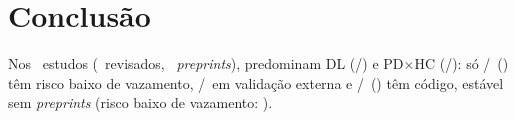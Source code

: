 \section{Conclusão} \label{sec:conclusao}

Nos \nTotal\ estudos (\nRevisadosPares\ revisados, \nPreprints\ \textit{preprints}),
predominam DL (\nFamDL/\nTotal) e PD$\times$HC (\nCenPDHC/\nTotal): só
\nRiscoBaixo/\nAplicaveisVaz\ (\pctRiscoBaixoAplic) têm risco baixo de vazamento,
\nValExtSim/\nTotal\ em validação externa e \nCodDisponivel/\nTotal\
(\pctCodDisponivel) têm código, estável sem \textit{preprints} (risco baixo de
vazamento: \pctRevRiscoBaixoAplic). 
